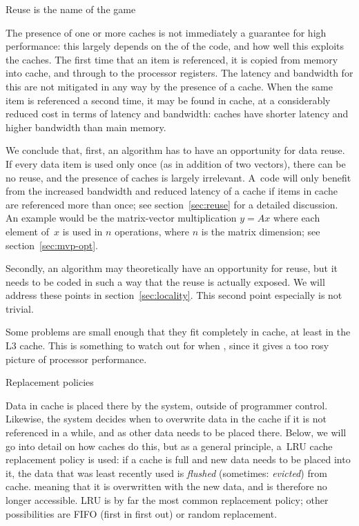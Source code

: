  {Reuse is the name of the game}

The presence of one or more caches is not immediately a guarantee for
high performance: this largely depends on the  of the code, and how well this exploits the caches.
The first time that an item is
referenced, it is copied from memory into cache, and through to the
processor registers. The latency and bandwidth for this are not mitigated in any
way by the presence of a cache. When the same item is referenced a
second time, it may be found in cache, at a considerably reduced cost
in terms of latency and bandwidth: caches have shorter latency and
higher bandwidth than main memory.

We conclude that, first, an algorithm has to have an opportunity for
data reuse. If every data item is used only once (as in addition of
two vectors), there can be no reuse, and the presence of caches is
largely irrelevant. A~code will only benefit from the increased
bandwidth and reduced latency of a cache if items in cache are
referenced more than once; see section~\ref{sec:reuse} for a detailed
discussion.
  An example would be the matrix-vector multiplication
  $y=Ax$ where each element of~$x$ is used in $n$ operations, where $n$
  is the matrix dimension;
  see section~\ref{sec:mvp-opt}.

Secondly, an algorithm may theoretically
have an opportunity for reuse, but it needs to be coded in such a way
that the reuse is actually exposed. We will address these points in
section~\ref{sec:locality}. This second point especially is not
trivial.


Some problems are small enough that they fit completely in cache, at
least in the L3 cache. This is something to watch out for when
, since it gives a too rosy picture of
processor performance.

 {Replacement policies}
\label{sec:lru}


Data in cache is placed there by the system, outside of
programmer control.
Likewise, the system decides when to overwrite
data in the cache if it is not referenced in a while,
and as other data needs to be placed there.  Below, we will go into
detail on how caches do this, but as a general principle,
a~\acf{LRU} cache replacement policy is used:
if a cache is full and new data
needs to be placed into it, the data that was least recently used is
\emph{flushed}
(sometimes: \emph{evicted})
from cache.
meaning that it is overwritten with the new data,
and is therefore no longer accessible. LRU is by far the most common
replacement policy; other possibilities are FIFO (first in first out)
or random replacement.

